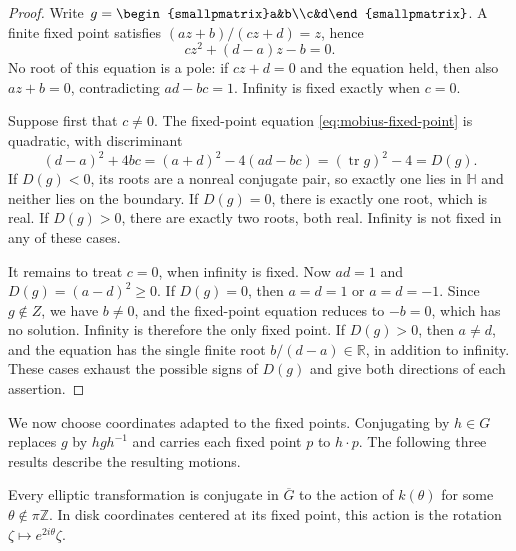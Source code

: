 \begin{proof}
Write $g=\begin{smallpmatrix}a&b\\c&d\end{smallpmatrix}$. A finite fixed point satisfies $(az+b)/(cz+d)=z$, hence
\begin{equation}\label{eq:mobius-fixed-point}
 cz^2+(d-a)z-b=0.
\end{equation}
No root of this equation is a pole: if $cz+d=0$ and the equation held, then also $az+b=0$, contradicting $ad-bc=1$. Infinity is fixed exactly when $c=0$.

Suppose first that $c\ne0$. The fixed-point equation \eqref{eq:mobius-fixed-point} is quadratic, with discriminant
\[
 (d-a)^2+4bc=(a+d)^2-4(ad-bc)=(\operatorname{tr}g)^2-4=D(g).
\]
If $D(g)<0$, its roots are a nonreal conjugate pair, so exactly one lies in $\mathbb H$ and neither lies on the boundary. If $D(g)=0$, there is exactly one root, which is real. If $D(g)>0$, there are exactly two roots, both real. Infinity is not fixed in any of these cases.

It remains to treat $c=0$, when infinity is fixed. Now $ad=1$ and $D(g)=(a-d)^2\geq0$. If $D(g)=0$, then $a=d=1$ or $a=d=-1$. Since $g\notin Z$, we have $b\ne0$, and the fixed-point equation reduces to $-b=0$, which has no solution. Infinity is therefore the only fixed point. If $D(g)>0$, then $a\ne d$, and the equation has the single finite root $b/(d-a)\in\mathbb R$, in addition to infinity. These cases exhaust the possible signs of $D(g)$ and give both directions of each assertion.
\end{proof}

\label{hyperbolic.normal-forms}
We now choose coordinates adapted to the fixed points. Conjugating by $h\in G$ replaces $g$ by $hgh^{-1}$ and carries each fixed point $p$ to $h\cdot p$. The following three results describe the resulting motions.

\begin{proposition}\label{hyperbolic.elliptic-normal-form}
Every elliptic transformation is conjugate in $\overline G$ to the action of $k(\theta)$ for some $\theta\notin\pi\mathbb Z$. In disk coordinates centered at its fixed point, this action is the rotation $\zeta\mapsto e^{2i\theta}\zeta$.
\end{proposition}

